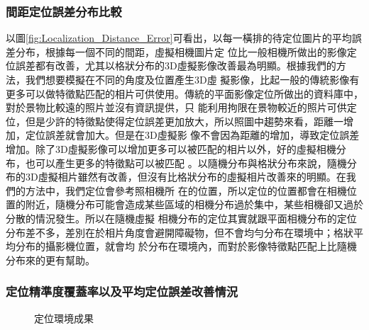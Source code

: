 \subsubsection{間距定位誤差分布比較}	
	
	以圖\ref{fig:Localization_Distance_Error}可看出，以每一橫排的待定位圖片的平均誤差分布，根據每一個不同的間距，虛擬相機圖片定
位比一般相機所做出的影像定位誤差都有改善，尤其以格狀分布的3D虛擬影像改善最為明顯。根據我們的方法，我們想要模擬在不同的角度及位置產生3D虛
擬影像，比起一般的傳統影像有更多可以做特徵點匹配的相片可供使用。傳統的平面影像定位所做出的資料庫中，對於景物比較遠的照片並沒有資訊提供，只
能利用拘限在景物較近的照片可供定位，但是少許的特徵點使得定位誤差更加放大，所以照圖中趨勢來看，距離一增加，定位誤差就會加大。但是在3D虛擬影
像不會因為距離的增加，導致定位誤差增加。除了3D虛擬影像可以增加更多可以被匹配的相片以外，好的虛擬相機分布，也可以產生更多的特徵點可以被匹配
。以隨機分布與格狀分布來說，隨機分布的3D虛擬相片雖然有改善，但沒有比格狀分布的虛擬相片改善來的明顯。在我們的方法中，我們定位會參考照相機所
在的位置，所以定位的位置都會在相機位置的附近，隨機分布可能會造成某些區域的相機分布過於集中，某些相機卻又過於分散的情況發生。所以在隨機虛擬
相機分布的定位其實就跟平面相機分布的定位分布差不多，差別在於相片角度會避開障礙物，但不會均勻分布在環境中；格狀平均分布的攝影機位置，就會均
於分布在環境內，而對於影像特徵點匹配上比隨機分布來的更有幫助。


\subsubsection{定位精準度覆蓋率以及平均定位誤差改善情況}	


\begin{figure}
	\begin{center}
	\end{center}
  \caption{定位環境成果}
  \label{fig:Controlled_EV_Result}	
\end{figure}		



